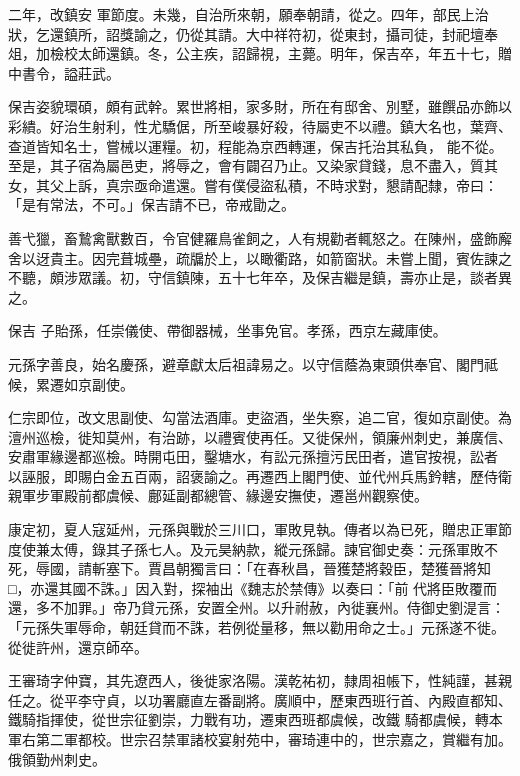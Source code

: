 \begin{pinyinscope}
 二年，改鎮安
 軍節度。未幾，自治所來朝，願奉朝請，從之。四年，部民上治狀，乞還鎮所，詔獎諭之，仍從其請。大中祥符初，從東封，攝司徒，封祀壇奉俎，加檢校太師還鎮。冬，公主疾，詔歸視，主薨。明年，保吉卒，年五十七，贈中書令，謚莊武。



 保吉姿貌環碩，頗有武幹。累世將相，家多財，所在有邸舍、別墅，雖饌品亦飾以彩繢。好治生射利，性尤驕倨，所至峻暴好殺，待屬吏不以禮。鎮大名也，葉齊、查道皆知名士，嘗械以運糧。初，程能為京西轉運，保吉托治其私負，
 能不從。至是，其子宿為屬邑吏，將辱之，會有闢召乃止。又染家貸錢，息不盡入，質其女，其父上訴，真宗亟命遣還。嘗有僕侵盜私積，不時求對，懇請配隸，帝曰：「是有常法，不可。」保吉請不已，帝戒勖之。



 善弋獵，畜鷙禽獸數百，令官健羅鳥雀飼之，人有規勸者輒怒之。在陳州，盛飾廨舍以迓貴主。因完葺城壘，疏牖於上，以瞰衢路，如箭窗狀。未嘗上聞，賓佐諫之不聽，頗涉眾議。初，守信鎮陳，五十七年卒，及保吉繼是鎮，壽亦止是，談者異之。



 保吉
 子貽孫，任崇儀使、帶御器械，坐事免官。孝孫，西京左藏庫使。



 元孫字善良，始名慶孫，避章獻太后祖諱易之。以守信蔭為東頭供奉官、閣門祗候，累遷如京副使。



 仁宗即位，改文思副使、勾當法酒庫。吏盜酒，坐失察，追二官，復如京副使。為澶州巡檢，徙知莫州，有治跡，以禮賓使再任。又徙保州，領廉州刺史，兼廣信、安肅軍緣邊都巡檢。時開屯田，鑿塘水，有訟元孫擅污民田者，遣官按視，訟者
 以誣服，即賜白金五百兩，詔褒諭之。再遷西上閣門使、並代州兵馬鈐轄，歷侍衛親軍步軍殿前都虞候、鄜延副都總管、緣邊安撫使，遷邕州觀察使。



 康定初，夏人寇延州，元孫與戰於三川口，軍敗見執。傳者以為已死，贈忠正軍節度使兼太傅，錄其子孫七人。及元昊納款，縱元孫歸。諫官御史奏：元孫軍敗不死，辱國，請斬塞下。賈昌朝獨言曰：「在春秋昌，晉獲楚將穀臣，楚獲晉將知□，亦還其國不誅。」因入對，探袖出《魏志於禁傳》以奏曰：「前
 代將臣敗覆而還，多不加罪。」帝乃貸元孫，安置全州。以升祔赦，內徙襄州。侍御史劉湜言：「元孫失軍辱命，朝廷貸而不誅，若例從量移，無以勸用命之士。」元孫遂不徙。從徙許州，還京師卒。



 王審琦字仲寶，其先遼西人，後徙家洛陽。漢乾祐初，隸周祖帳下，性純謹，甚親任之。從平李守貞，以功署廳直左番副將。廣順中，歷東西班行首、內殿直都知、鐵騎指揮使，從世宗征劉崇，力戰有功，遷東西班都虞候，改鐵
 騎都虞候，轉本軍右第二軍都校。世宗召禁軍諸校宴射苑中，審琦連中的，世宗嘉之，賞繼有加。俄領勤州刺史。




\end{pinyinscope}
